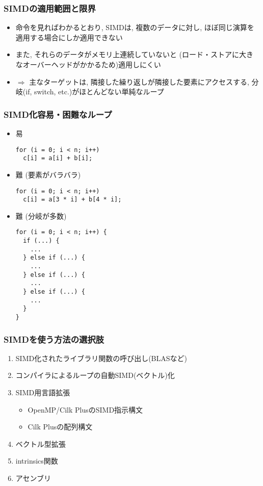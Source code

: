 \documentclass[10pt,dvipdfmx]{beamer}
\newcommand{\ao}[1]{{\color{blue}#1}}
\begin{document}
\begin{frame}
\frametitle{SIMDの適用範囲と限界}
\begin{itemize}
\item 命令を見ればわかるとおり, SIMDは,
  複数のデータに対し, ほぼ同じ演算を適用する場合にしか適用できない
\item また, それらのデータがメモリ上連続していないと
  (ロード・ストアに大きなオーバーヘッドがかかるため)適用しにくい

\item $\Rightarrow$ 主なターゲットは,
  隣接した繰り返しが隣接した要素にアクセスする,
  分岐(if, switch, etc.)がほとんどない単純なループ
\end{itemize}
\end{frame}

\begin{frame}[fragile]
\frametitle{SIMD化容易・困難なループ}
\begin{itemize}
\item [] 易
\begin{lstlisting}
for (i = 0; i < n; i++)
  c[i] = a[i] + b[i];
\end{lstlisting}
  \item [] 難 (要素がバラバラ)
\begin{lstlisting}
for (i = 0; i < n; i++)
  c[i] = a[3 * i] + b[4 * i];
\end{lstlisting}
  \item [] 難 (分岐が多数)
\begin{lstlisting}
for (i = 0; i < n; i++) {
  if (...) {
    ...
  } else if (...) {
    ...
  } else if (...) {
    ...
  } else if (...) {
    ...
  }
}
\end{lstlisting}
\end{itemize}
\end{frame}

\begin{frame}[fragile]
\frametitle{SIMDを使う方法の選択肢}
\begin{enumerate}
\item SIMD化されたライブラリ関数の呼び出し(BLASなど)
\item コンパイラによるループの自動SIMD(ベクトル)化
\item SIMD用言語拡張
  \begin{itemize}
  \item OpenMP/Cilk PlusのSIMD指示構文
  \item Cilk Plusの配列構文
  \end{itemize}
\item \ao{ベクトル型拡張}
\item \ao{intrinsics関数} 
\item アセンブリ
\end{enumerate}
\end{frame}
\end{document}
